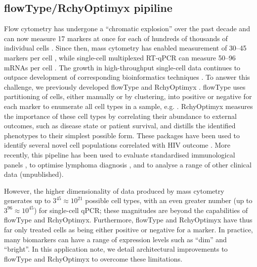  \subsection{flowType/RchyOptimyx pipiline}
 Flow cytometry has undergone a ``chromatic explosion'' over the past decade and can now measure 17 markers at once for each of hundreds of thousands of individual cells \cite{Chattopadhyay2008}.
Since then, mass cytometry has enabled measurement of 30--45 markers per cell \cite{Bendall2012a}, while single-cell multiplexed RT-qPCR can measure 50--96 mRNAs per cell \cite{White2011}. 
The growth in high-throughput single-cell data continues to outpace development of corresponding bioinformatics techniques \cite{Chattopadhyay2008}.
To answer this challenge, we previously developed flowType \cite{Aghaeepour2012} and RchyOptimyx \cite{Aghaeepour2012a}. 
flowType uses partitioning of cells, either manually or by clustering, into positive or negative for each marker to enumerate all cell types in a sample, e.g. \cite{Aghaeepour2013Critical}.
RchyOptimyx measures the importance of these cell types by correlating their abundance to external outcomes, such as disease state or patient survival, and distills the identified phenotypes to their simplest possible form. 
These packages have been used to identify several novel cell populations correlated with HIV outcome \cite{Aghaeepour2012}. 
More recently, this pipeline has been used to evaluate standardised immunological panels \cite{Villanovaa2013Computational}, to optimise lymphoma diagnosis \cite{Craig2013Computational}, and to analyse a range of other clinical data (unpublished).

However, the higher dimensionality of data produced by mass cytometry generates up to $3^{45}\approx10^{21}$ possible cell types, with an even greater number (up to $3^{96}\approx10^{45}$) for single-cell qPCR; these magnitudes are beyond the capabilities of flowType and RchyOptimyx.
Furthermore, flowType and RchyOptimyx have thus far only treated cells as being either positive or negative for a marker.
In practice, many biomarkers can have a range of expression levels such as ``dim'' and ``bright''. 
In this application note, we detail architectural improvements to flowType and RchyOptimyx to overcome these limitations.  
